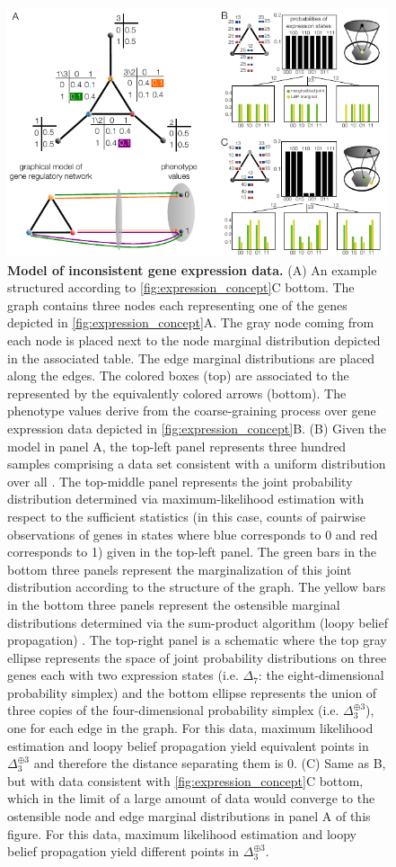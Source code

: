 \begin{figure}[!ht]
\centering
\noindent\includegraphics[width=0.9\columnwidth]{fig/inconsistentthreecycle.pdf}
\caption{{\bf Model of inconsistent gene expression data.} (A) An example structured according to \ref{fig:expression_concept}C bottom. The graph contains three nodes each representing one of the genes depicted in \ref{fig:expression_concept}A. The gray node coming from each node is placed next to the node marginal distribution depicted in the associated table. The edge marginal distributions are placed along the edges. The colored boxes (top) are associated to the \gnpm{} represented by the equivalently colored arrows (bottom). The phenotype values derive from the coarse-graining process over gene expression data depicted in \ref{fig:expression_concept}B. (B) Given the model in panel A, the top-left panel represents three hundred samples comprising a data set consistent with a uniform distribution over all \gnpm{}. The top-middle panel represents the joint probability distribution determined via maximum-likelihood estimation with respect to the sufficient statistics (in this case, counts of pairwise observations of genes in states where blue corresponds to 0 and red corresponds to 1) given in the top-left panel. The green bars in the bottom three panels represent the marginalization of this joint distribution according to the structure of the graph. The yellow bars in the bottom three panels represent the ostensible marginal distributions determined via the sum-product algorithm (loopy belief propagation) \cite{Barber2012}. The top-right panel is a schematic where the top gray ellipse represents the space of joint probability distributions on three genes each with two expression states (i.e. $\Delta_7$: the eight-dimensional probability simplex) and the bottom ellipse represents the union of three copies of the four-dimensional probability simplex (i.e. $\Delta_3^{\oplus 3}$), one for each edge in the graph.  For this data, maximum likelihood estimation and loopy belief propagation yield equivalent points in $\Delta_3^{\oplus 3}$ and therefore the distance separating them is $0$. (C) Same as B, but with data consistent with \ref{fig:expression_concept}C bottom, which in the limit of a large amount of data would converge to the ostensible node and edge marginal distributions in panel A of this figure. For this data, maximum likelihood estimation and loopy belief propagation yield different points in $\Delta_3^{\oplus 3}$.}
\label{fig:inconsistentthreecycle}
\end{figure}

